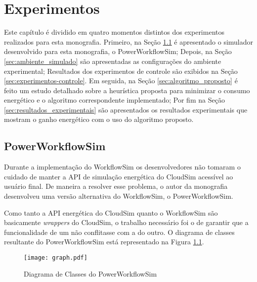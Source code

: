 \chapter{Experimentos}
\label{cap:experimentos}
Este capítulo é dividido em quatro momentos distintos dos experimentos realizados
para esta monografia. Primeiro, na Seção \ref{sec:powerworkflowsim} é
apresentado o simulador desenvolvido para esta monografia, o PowerWorkflowSim;
Depois, na Seção \ref{sec:ambiente_simulado} são
apresentadas as configurações do ambiente experimental; Resultados dos 
experimentos de controle são exibidos na Seção \ref{sec:experimentos-controle}.
Em seguida, na Seção
\ref{sec:algoritmo_proposto} é feito um estudo detalhado sobre a heurística
proposta para minimizar o consumo energético e o algoritmo correspondente
implementado; Por fim na Seção \ref{sec:resultados_experimentais} são
apresentados os resultados experimentais que mostram o ganho energético com
o uso do algoritmo proposto.

\section{PowerWorkflowSim}
\label{sec:powerworkflowsim}
Durante a implementação do WorkflowSim os desenvolvedores não tomaram o cuidado
de manter a API de simulação energética do CloudSim acessível ao usuário final.
De maneira a resolver esse problema, o autor da monografia desenvolveu uma versão
alternativa do WorkflowSim, o PowerWorkflowSim.

Como tanto a API energética do CloudSim quanto o WorkflowSim são basicamente 
\emph{wrappers} do CloudSim, o trabalho necessário foi o de garantir que 
a funcionalidade de um não conflitasse com a do outro. O diagrama de classes
resultante do PowerWorkflowSim está representado na Figura
\ref{fig:classes_powerworkflowsim}.

\begin{figure}[ht]
\centering
\texttt{[image: graph.pdf]}
\caption{Diagrama de Classes do PowerWorkflowSim}
\label{fig:classes_powerworkflowsim}
\end{figure}


